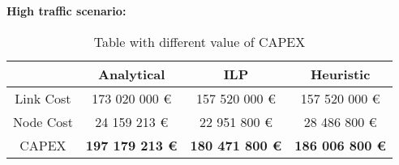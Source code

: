 \vspace{11pt}
\textbf{High traffic scenario:}\\

\begin{table}[h!]
\centering
\begin{tabular}{| c | c | c | c |}
 \hline
   & Analytical & ILP & Heuristic \\
 \hline\hline
 Link Cost & 173 020 000 \euro & 157 520 000 \euro & 157 520 000 \euro \\
 Node Cost & 24 159 213 \euro & 22 951 800 \euro & 28 486 800 \euro \\
 CAPEX & \textbf{197 179 213 \euro} & \textbf{180 471 800 \euro} & \textbf{186 006 800 \euro} \\
 \hline
\end{tabular}
\caption{Table with different value of CAPEX }
\label{table_comparative_transp_sur_ref_3}
\end{table}

